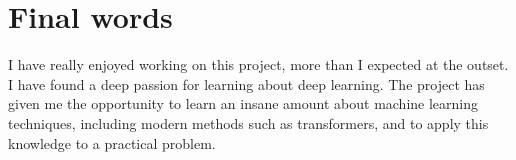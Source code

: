 \section{Final words}

I have really enjoyed working on this project, more than I expected at the outset. I have found a deep passion for learning about deep learning. The project has given me the opportunity to learn an insane amount about machine learning techniques, including modern methods such as transformers, and to apply this knowledge to a practical problem. 
